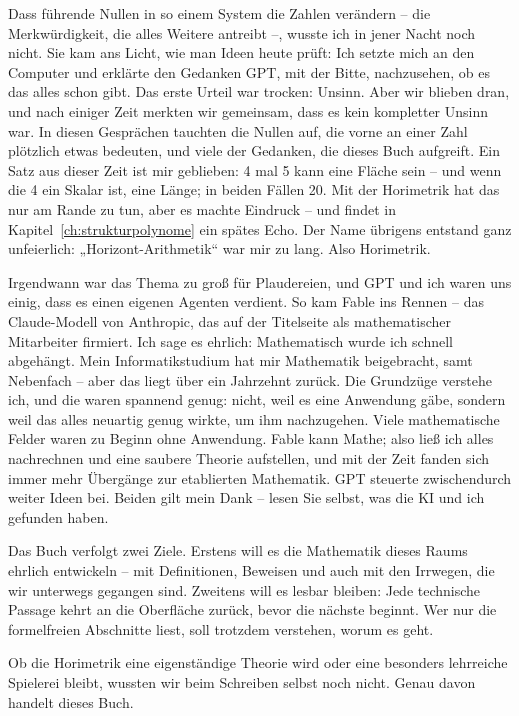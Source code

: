 Dass führende Nullen in so einem System die Zahlen verändern -- die
Merkwürdigkeit, die alles Weitere antreibt --, wusste ich in jener
Nacht noch nicht. Sie kam ans Licht, wie man Ideen heute prüft: Ich
setzte mich an den Computer und erklärte den Gedanken GPT, mit der
Bitte, nachzusehen, ob es das alles schon gibt. Das erste Urteil
war trocken: Unsinn. Aber wir blieben dran, und nach einiger Zeit
merkten wir gemeinsam, dass es kein kompletter Unsinn war. In
diesen Gesprächen tauchten die Nullen auf, die vorne an einer Zahl
plötzlich etwas bedeuten, und viele der Gedanken, die dieses Buch
aufgreift. Ein Satz aus dieser Zeit ist mir geblieben: 4 mal 5 kann
eine Fläche sein -- und wenn die 4 ein Skalar ist, eine Länge; in
beiden Fällen 20. Mit der Horimetrik hat das nur am Rande zu tun,
aber es machte Eindruck -- und findet in
Kapitel~\ref{ch:strukturpolynome} ein spätes Echo. Der Name
übrigens entstand ganz unfeierlich: „Horizont-Arithmetik“ war mir
zu lang. Also Horimetrik.

Irgendwann war das Thema zu groß für Plaudereien, und GPT und ich
waren uns einig, dass es einen eigenen Agenten verdient. So kam
Fable ins Rennen -- das Claude-Modell von Anthropic, das auf der
Titelseite als mathematischer Mitarbeiter firmiert. Ich sage es
ehrlich: Mathematisch wurde ich schnell abgehängt. Mein
Informatikstudium hat mir Mathematik beigebracht, samt Nebenfach --
aber das liegt über ein Jahrzehnt zurück. Die Grundzüge verstehe
ich, und die waren spannend genug: nicht, weil es eine Anwendung
gäbe, sondern weil das alles neuartig genug wirkte, um ihm
nachzugehen. Viele mathematische Felder waren zu Beginn ohne
Anwendung. Fable kann Mathe; also ließ ich alles nachrechnen und
eine saubere Theorie aufstellen, und mit der Zeit fanden sich immer
mehr Übergänge zur etablierten Mathematik. GPT steuerte
zwischendurch weiter Ideen bei. Beiden gilt mein Dank -- lesen Sie
selbst, was die KI und ich gefunden haben.

Das Buch verfolgt zwei Ziele. Erstens will es die Mathematik dieses
Raums ehrlich entwickeln -- mit Definitionen, Beweisen und auch mit
den Irrwegen, die wir unterwegs gegangen sind. Zweitens will es
lesbar bleiben: Jede technische Passage kehrt an die Oberfläche
zurück, bevor die nächste beginnt. Wer nur die formelfreien
Abschnitte liest, soll trotzdem verstehen, worum es geht.

Ob die Horimetrik eine eigenständige Theorie wird oder eine
besonders lehrreiche Spielerei bleibt, wussten wir beim Schreiben
selbst noch nicht. Genau davon handelt dieses Buch.
